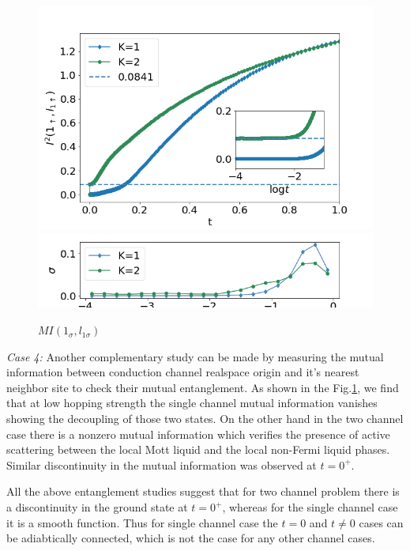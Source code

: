 \documentclass[reprint,prb,superscriptaddress]{revtex4-2}
\begin{document}
\begin{figure}[!htpb]
\includegraphics[scale=0.4]{plt/A_I2_ch12_['1','l1']}
\includegraphics[scale=0.4]{plt/errorbar_A_I2_ch12_['1','l1']}
\caption{$MI(1_{\sigma},l_{1\sigma})$}
\label{fig:MI_l_l1}
\end{figure}

\par \textit{Case 4:} Another complementary study can be made by measuring the mutual information between conduction channel realspace origin and it's nearest neighbor site to check their mutual entanglement. As shown in the Fig.\ref{fig:MI_l_l1}, we find that at low hopping strength the single channel mutual information vanishes showing the decoupling of those two states. On the other hand in the two channel case there is a nonzero mutual information which verifies the presence of active scattering between the local Mott liquid and the local non-Fermi liquid phases. Similar discontinuity in the mutual information was observed at $t=0^+$.


\par All the above  entanglement studies suggest that for two channel problem there is a discontinuity in the ground state at $t=0^{+}$, whereas for the single channel case it is a smooth function. Thus for single channel case the $t=0$ and $t\neq 0$ cases can be adiabtically connected, which is not the case for any other channel cases. 
\end{document}
